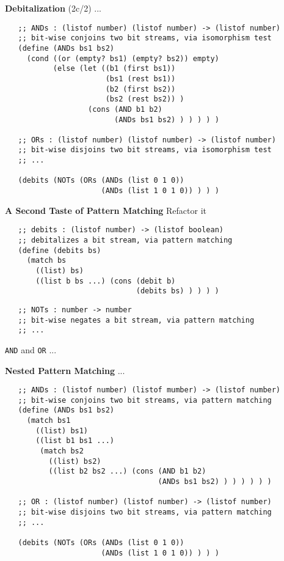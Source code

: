 \documentclass[12pt]{beamer}
\begin{document}
\begin{frame}[fragile]{{\bf Debitalization} (2c/2)}
 ...

 \pause

 {\scriptsize
  \begin{verbatim}
   ;; ANDs : (listof number) (listof number) -> (listof number)
   ;; bit-wise conjoins two bit streams, via isomorphism test
   (define (ANDs bs1 bs2)
     (cond ((or (empty? bs1) (empty? bs2)) empty)
           (else (let ((b1 (first bs1))
                       (bs1 (rest bs1))
                       (b2 (first bs2))
                       (bs2 (rest bs2)) )
                   (cons (AND b1 b2)
                         (ANDs bs1 bs2) ) ) ) ) )

   ;; ORs : (listof number) (listof number) -> (listof number)
   ;; bit-wise disjoins two bit streams, via isomorphism test
   ;; ...

   (debits (NOTs (ORs (ANDs (list 0 1 0))
                      (ANDs (list 1 0 1 0)) ) ) )
  \end{verbatim}
 }
\end{frame}

\begin{frame}[fragile]{\bf A Second Taste of Pattern Matching}
 Refactor it
 {\scriptsize
  \begin{verbatim}
   ;; debits : (listof number) -> (listof boolean)
   ;; debitalizes a bit stream, via pattern matching
   (define (debits bs)
     (match bs
       ((list) bs)
       ((list b bs ...) (cons (debit b)
                              (debits bs) ) ) ) )
  \end{verbatim}
 }

 \pause

 {\scriptsize
  \begin{verbatim}
   ;; NOTs : number -> number
   ;; bit-wise negates a bit stream, via pattern matching
   ;; ...
  \end{verbatim}
 }

 \pause

 \verb|AND| and \verb|OR| ...
\end{frame}

\begin{frame}[fragile]{\bf Nested Pattern Matching}
 ...

 {\scriptsize
  \begin{verbatim}
   ;; ANDs : (listof number) (listof mumber) -> (listof number)
   ;; bit-wise conjoins two bit streams, via pattern matching
   (define (ANDs bs1 bs2)
     (match bs1
       ((list) bs1)
       ((list b1 bs1 ...)
        (match bs2
          ((list) bs2)
          ((list b2 bs2 ...) (cons (AND b1 b2)
                                   (ANDs bs1 bs2) ) ) ) ) ) )

   ;; OR : (listof number) (listof number) -> (listof number)
   ;; bit-wise disjoins two bit streams, via pattern matching
   ;; ...

   (debits (NOTs (ORs (ANDs (list 0 1 0))
                      (ANDs (list 1 0 1 0)) ) ) )
  \end{verbatim}
 }
\end{frame}
\end{document}
